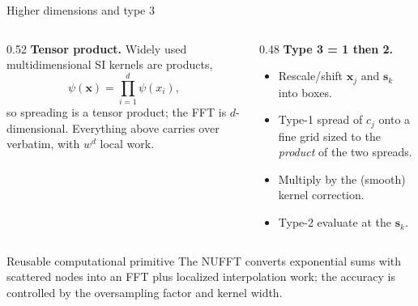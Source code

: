 \documentclass[aspectratio=169,11pt]{beamer}
\newcommand{\x}{\bm{x}}
\newcommand{\svec}{\bm{s}}
\begin{document}
\begin{frame}{Higher dimensions and type 3}
\small
\begin{columns}[T,totalwidth=\textwidth]
\begin{column}{0.52\textwidth}
\textbf{Tensor product.} Widely used multidimensional SI kernels are products,
\[
  \psi(\x)=\prod_{i=1}^d \psi(x_i),
\]
so spreading is a tensor product; the FFT is \(d\)-dimensional. Everything above carries over verbatim, with \(w^d\) local work.
\end{column}
\begin{column}{0.48\textwidth}
\textbf{Type 3 = 1 then 2.}
\begin{itemize}\itemsep2pt
  \item Rescale/shift \(\x_j\) and \(\svec_k\) into boxes.
  \item Type-1 spread of \(c_j\) onto a fine grid sized to the \emph{product} of the two spreads.
  \item Multiply by the (smooth) kernel correction.
  \item Type-2 evaluate at the \(\svec_k\).
\end{itemize}
\end{column}
\end{columns}
\vspace{2mm}
\begin{block}{Reusable computational primitive}
The NUFFT converts exponential sums with scattered nodes into an FFT plus
localized interpolation work; the accuracy is controlled by the oversampling
factor and kernel width.
\end{block}
\end{frame}
\end{document}
